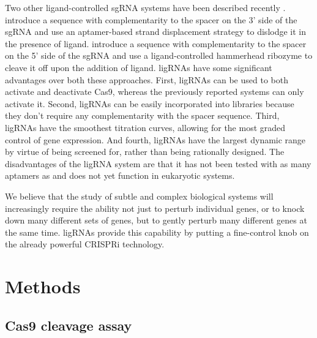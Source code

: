 \documentclass[10pt,oneside]{article}
\begin{document}

Two other ligand-controlled sgRNA systems have been described recently \autocite{liu2016,tang2017}.   introduce a sequence with complementarity to the spacer on the 3' side of the sgRNA and use an aptamer-based strand displacement strategy to dislodge it in the presence of ligand.   introduce a sequence with complementarity to the spacer on the 5' side of the sgRNA and use a ligand-controlled hammerhead ribozyme to cleave it off upon the addition of ligand.  ligRNAs have some significant advantages over both these approaches.  First, ligRNAs can be used to both activate and deactivate Cas9, whereas the previously reported systems can only activate it.  Second, ligRNAs can be easily incorporated into libraries because they don't require any complementarity with the spacer sequence.  Third, ligRNAs have the smoothest titration curves, allowing for the most graded control of gene expression.  And fourth, ligRNAs have the largest dynamic range by virtue of being screened for, rather than being rationally designed.  The disadvantages of the ligRNA system are that it has not been tested with as many aptamers as  and does not yet function in eukaryotic systems.


We believe that the study of subtle and complex biological systems will increasingly require the ability not just to perturb individual genes, or to knock down many different sets of genes, but to gently perturb many different genes at the same time.  ligRNAs provide this capability by putting a fine-control knob on the already powerful CRISPRi technology.

\section{Methods}

\subsection{\Invitro{} Cas9 cleavage assay}
\end{document}

